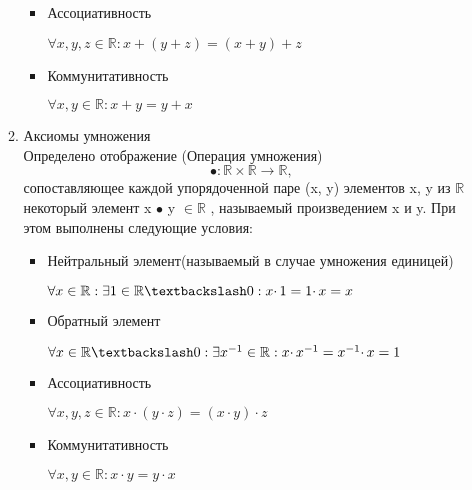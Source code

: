 \documentclass[a4paper,14pt]{extreport} %
\begin{document}
\begin{center}
\begin{enumerate}
\begin{enumerate}[label=(\Roman*)]
\begin{itemize}
				\item Ассоциативность
				\begin{center}
					$\forall x,y,z \in \mathbb{R}: x+(y+z)=(x+y)+z$
				\end{center}
				\newpage
				\item Коммунитативность
				\begin{center}
					$\forall x,y \in \mathbb{R}: x+y=y+x$
				\end{center}
			\end{itemize}
		
		
			\item Аксиомы умножения\\
			
			Определено отображение (Операция умножения)
			\begin{equation}
				\bullet: \mathbb {R} \times \mathbb {R} \rightarrow \mathbb {R},
			\end{equation}
			сопоставляющее каждой упорядоченной паре (x, y) элементов x, y из $\mathbb {R}$
			некоторый элемент x $\bullet$ y $\in \mathbb {R}$ , называемый произведением x и y. При этом выполнены следующие условия:
			
			\begin{itemize}
				\item Нейтральный элемент(называемый в случае умножения единицей)
				\begin{center}
					$\forall x \in \mathbb{R}: \exists1\in \mathbb{R}\textbackslash0: x\cdotp1=1\cdotp x=x$
				\end{center}
				
				\item Обратный элемент
				\begin{center}
					$\forall x \in \mathbb{R}\textbackslash0: \exists x^{-1} \in \mathbb{R}: x\cdotp x^{-1} =x^{-1}\cdotp x = 1 $
				\end{center}
				
				\item Ассоциативность
				\begin{center}
					$\forall x,y,z \in \mathbb{R}: x\cdotp(y\cdotp z)=(x\cdotp y)\cdotp z$
				\end{center}
				
				\item Коммунитативность
				\begin{center}
					$\forall x,y \in \mathbb{R}: x\cdotp y=y \cdotp x$
				\end{center}
			\end{itemize}
			

\end{enumerate}
\end{enumerate}
\end{center}
\end{document}

